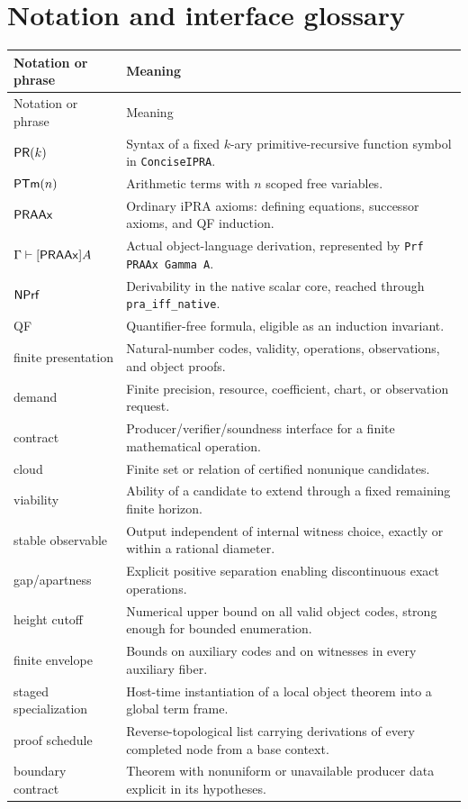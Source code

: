 \section{Notation and interface glossary}
\label{app:notation}

\begin{longtable}{@{}p{}p{}@{}}
\toprule
Notation or phrase & Meaning \\
\midrule
\endfirsthead
\toprule
Notation or phrase & Meaning \\
\midrule
\endhead
\(\mathsf{PR}(k)\) & Syntax of a fixed \(k\)-ary primitive-recursive function symbol in \texttt{ConciseIPRA}. \\
\(\mathsf{PTm}(n)\) & Arithmetic terms with \(n\) scoped free variables. \\
\(\mathsf{PRAAx}\) & Ordinary iPRA axioms: defining equations, successor axioms, and QF induction. \\
\(\Gamma\vdash[\mathsf{PRAAx}]A\) & Actual object-language derivation, represented by \texttt{Prf PRAAx Gamma A}. \\
\(\mathsf{NPrf}\) & Derivability in the native scalar core, reached through \texttt{pra\_iff\_native}. \\
QF & Quantifier-free formula, eligible as an induction invariant. \\
finite presentation & Natural-number codes, validity, operations, observations, and object proofs. \\
demand & Finite precision, resource, coefficient, chart, or observation request. \\
contract & Producer/verifier/soundness interface for a finite mathematical operation. \\
cloud & Finite set or relation of certified nonunique candidates. \\
viability & Ability of a candidate to extend through a fixed remaining finite horizon. \\
stable observable & Output independent of internal witness choice, exactly or within a rational diameter. \\
gap/apartness & Explicit positive separation enabling discontinuous exact operations. \\
height cutoff & Numerical upper bound on all valid object codes, strong enough for bounded enumeration. \\
finite envelope & Bounds on auxiliary codes and on witnesses in every auxiliary fiber. \\
staged specialization & Host-time instantiation of a local object theorem into a global term frame. \\
proof schedule & Reverse-topological list carrying derivations of every completed node from a base context. \\
boundary contract & Theorem with nonuniform or unavailable producer data explicit in its hypotheses. \\
\bottomrule
\end{longtable}

